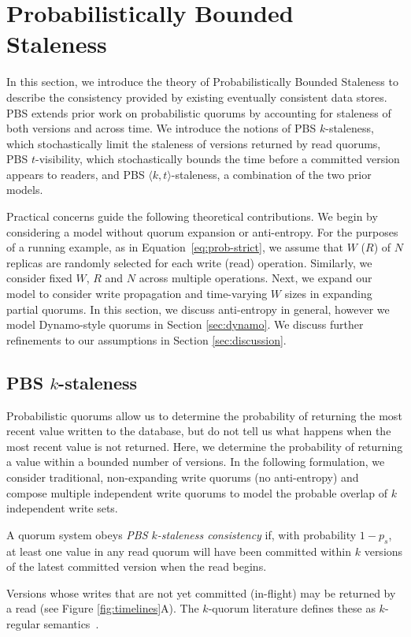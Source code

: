 \documentclass{vldb}
\newcommand{\sectionskip}{-0em}
\newcommand{\subsectionskip}{-0em}
\begin{document}
\vspace{\sectionskip}\section{Probabilistically Bounded\\Staleness}
\label{sec:pbs}

In this section, we introduce the theory of Probabilistically Bounded
Staleness to describe the consistency provided by existing eventually
consistent data stores.  PBS extends prior work on
probabilistic quorums by accounting for staleness of both versions and
across time.  We introduce the notions of PBS $k$-staleness, which
stochastically limit the staleness of versions returned by read
quorums, PBS $t$-visibility, which stochastically bounds the time
before a committed version appears to readers, and PBS $\langle k,
t \rangle$-staleness, a combination of the two prior models.


Practical concerns guide the following theoretical contributions.  We
begin by considering a model without quorum expansion or anti-entropy.
For the purposes of a running example, as in
Equation~\ref{eq:prob-strict}, we assume that $W$ ($R$) of $N$
replicas are randomly selected for each write (read) operation.
Similarly, we consider fixed $W$, $R$ and $N$ across multiple
operations. Next, we expand our model to consider write propagation
and time-varying $W$ sizes in expanding partial quorums.  In this
section, we discuss anti-entropy in general, however we model
Dynamo-style quorums in Section \ref{sec:dynamo}. We discuss further
refinements to our assumptions in Section \ref{sec:discussion}.

\vspace{\subsectionskip}\subsection{PBS $k$-staleness}
\label{sec:kstale}

Probabilistic quorums allow us to determine the probability of
returning the most recent value written to the database, but do not
tell us what happens when the most recent value is not returned.
Here, we determine the probability of returning a value within a
bounded number of versions.  In the following formulation, we consider
traditional, non-expanding write quorums (no anti-entropy) and compose
multiple independent write quorums to model the probable overlap of
$k$ independent write sets.
\begin{definition}
A quorum system obeys \textit{PBS $k$-staleness consistency} if, with
probability $1-p_{s}$, at least one value in any read quorum will
have been committed within $k$ versions of the latest committed
version when the read begins.
\end{definition}
Versions whose writes that are not yet committed (in-flight) may be
returned by a read (see Figure \ref{fig:timelines}A).  The $k$-quorum
literature defines these as $k$-regular semantics~\cite{non-strict}.
\end{document}
